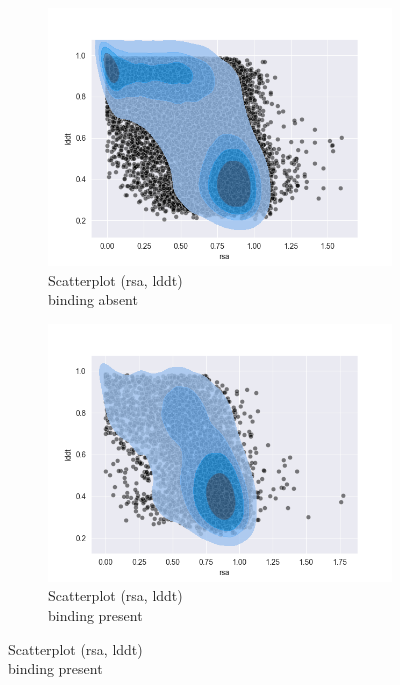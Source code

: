 \pagebreak

\begin{figure}[h!]
    \begin{subfigure}{0.5\linewidth}
        \includegraphics[width=\linewidth]{res/analysis/plots/bind0-scatter_rsa-lddt.png}
        \caption{Scatterplot (rsa, lddt)\\binding absent}
    \end{subfigure}
    \begin{subfigure}{0.5\linewidth}
        \includegraphics[width=\linewidth]{res/analysis/plots/bind1-scatter_rsa-lddt.png}
        \caption{Scatterplot (rsa, lddt)\\binding present}
    \end{subfigure}
\end{figure}
\pagebreak

